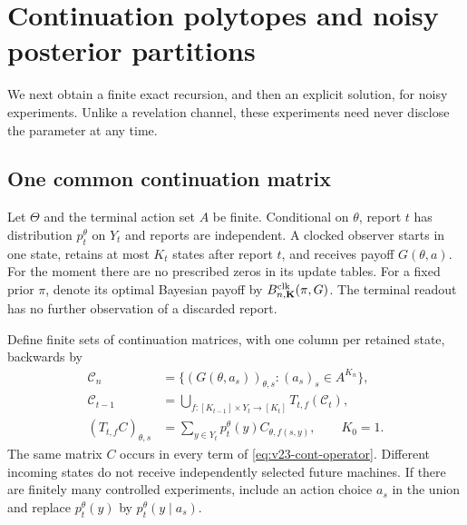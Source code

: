 \section{Continuation polytopes and noisy posterior partitions}
\label{sec:v23-binary}
We next obtain a finite exact recursion, and then an explicit solution,
for noisy experiments. Unlike a revelation channel, these experiments
need never disclose the parameter at any time.

\subsection{One common continuation matrix}
Let $\Theta$ and the terminal action set $A$ be finite. Conditional on
$\theta$, report $t$ has distribution $p_t^\theta$ on $Y_t$ and reports
are independent. A clocked observer starts in one state, retains at
most $K_t$ states after report $t$, and receives payoff $G(\theta,a)$.
For the moment there are no prescribed zeros in its update tables.
For a fixed prior $\pi$, denote its optimal Bayesian payoff by
$B^{\rm clk}_{n,\mathbf K}(\pi,G)$. The terminal readout has no further
observation of a discarded report.

Define finite sets of continuation matrices, with one column per
retained state, backwards by
\begin{align}
 \mathscr C_n&=\{(G(\theta,a_s))_{\theta,s}:
                                     (a_s)_s\in A^{K_n}\},
                                        \label{eq:v23-cont-terminal}\\
 \mathscr C_{t-1}&=\bigcup_{f:[K_{t-1}]\times Y_t\to[K_t]}
                              T_{t,f}(\mathscr C_t),
                                        \label{eq:v23-cont-backward}\\
 (T_{t,f}C)_{\theta,s}&=\sum_{y\in Y_t}
                                p_t^\theta(y)C_{\theta,f(s,y)},
 \qquad K_0=1.                         \label{eq:v23-cont-operator}
\end{align}
The same matrix $C$ occurs in every term of
\eqref{eq:v23-cont-operator}. Different incoming states do not receive
independently selected future machines. If there are finitely many
controlled experiments, include an action choice $a_s$ in the union
and replace $p_t^\theta(y)$ by $p_t^\theta(y\mid a_s)$.

